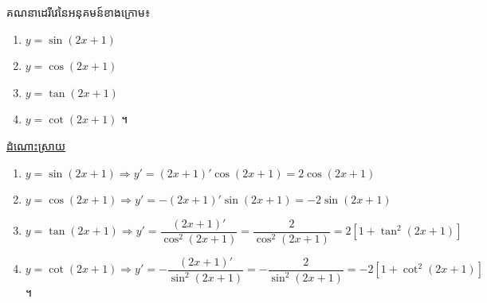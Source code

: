 \documentclass[12pt,fleqn]{book} %
\newcommand{\answer}{\begin{center}
\kml \color{blue} \underline{ដំណោះស្រាយ}
\end{center}}
\begin{document}
\begin{example}
គណនាដេរីវេនៃអនុគមន៍ខាងក្រោម៖
\begin{multicols}{2}
\begin{enumerate}
\item $y=\sin (2x+1)$
\item $y=\cos (2x+1)$
\item $y=\tan (2x+1)$
\item $y=\cot (2x+1)$ ។
\end{enumerate}
\end{multicols}
\end{example}
\answer 
\begin{enumerate}
\item $y=\sin (2x+1) \Rightarrow y'=(2x+1)'\cos (2x+1)=2\cos (2x+1)$
\item $y=\cos (2x+1)\Rightarrow y'=-(2x+1)'\sin (2x+1)=-2\sin (2x+1)$
\item $y=\tan (2x+1)\Rightarrow y'=\dfrac{(2x+1)'}{\cos^2 (2x+1)}=\dfrac{2}{\cos^2 (2x+1)}=2[1+\tan^2(2x+1)]$
\item $y=\cot (2x+1)\Rightarrow y'=-\dfrac{(2x+1)'}{\sin ^2 (2x+1)}=-\dfrac{2}{\sin^2 (2x+1)}=-2[1+\cot^2 (2x+1)]$ ។
\end{enumerate}
\end{document}
